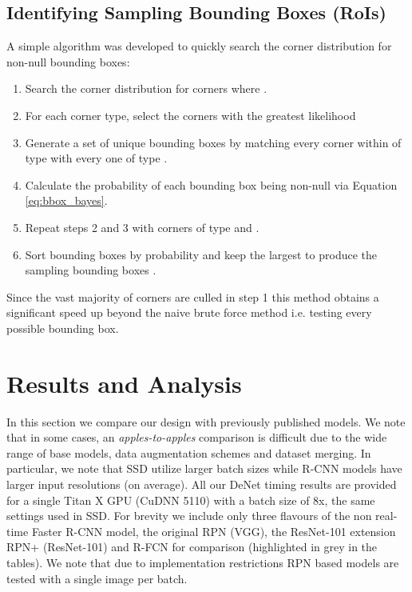 \documentclass[10pt,twocolumn]{article}
\begin{document}
\subsection{Identifying Sampling Bounding Boxes (RoIs)} \label{sec:implement_sample_bbox} 

A simple algorithm was developed to quickly search the corner distribution for non-null bounding boxes:
\begin{enumerate}
\item Search the corner distribution for corners  where . \item For each corner type, select the  corners with the greatest likelihood 
\item Generate a set of unique bounding boxes by matching every corner within  of type  with every one of type .
\item Calculate the probability of each bounding box being non-null via Equation \ref{eq:bbox_bayes}.
\item Repeat steps 2 and 3 with corners of type  and .
\item Sort bounding boxes by probability and keep the  largest to produce the sampling bounding boxes .
\end{enumerate}
Since the vast majority of corners are culled in step 1 this method obtains a significant speed up beyond the naive brute force method i.e. testing every possible bounding box. 

\section{Results and Analysis}

In this section we compare our design with previously published models. We note that in some cases, an \textit{apples-to-apples} comparison is difficult due to the wide range of base models, data augmentation schemes and dataset merging. In particular, we note that SSD utilize larger batch sizes while R-CNN models have larger input resolutions (on average). All our DeNet timing results are provided for a single Titan X GPU (CuDNN 5110) with a batch size of 8x, the same settings used in SSD. For brevity we include only three flavours of the non real-time Faster R-CNN model, the original RPN (VGG), the ResNet-101 extension RPN+ (ResNet-101) and R-FCN for comparison (highlighted in grey in the tables). We note that due to implementation restrictions RPN based models are tested with a single image per batch.
\end{document}
